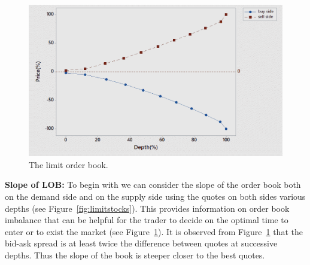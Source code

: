 	\begin{figure}[H]
	\centering
	\includegraphics[width=1.0\textwidth]{chapters/chapter_trade_data_models/figures/lobshape.png} 
	\caption{The limit order book. \label{fig:presentshape}}
	\end{figure}


\noindent \textbf{Slope of LOB:} To begin with we can consider the slope of the order book both on the demand side and on the supply side using the quotes on both sides various depths (see Figure~\ref{fig:limitstocks}). This provides information on order book imbalance that can be helpful for the trader to decide on the optimal time to enter or to exist the market (see Figure~\ref{fig:presentshape}). It is observed from Figure~\ref{fig:presentshape} that the bid-ask spread is at least twice the difference between quotes at successive depths. Thus the slope of the book is steeper closer to the best quotes. \\


